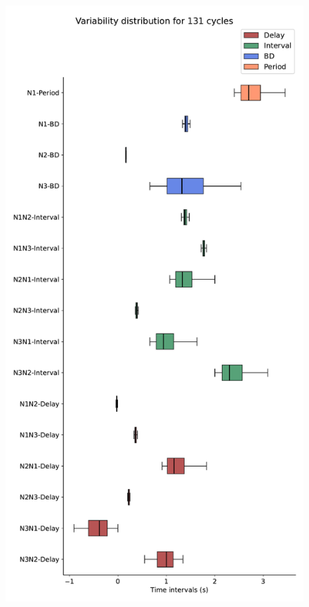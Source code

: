 %
%      
%
%
%


\begin{figure}[hbt!]
	\begin{minipage}[b]{0.45\textwidth}
		\centering
		\includegraphics[width=\textwidth]{invariants/data/MODEL/n3t_driven/images/3phases/_boxplot.pdf}

\end{minipage}
\end{figure}
